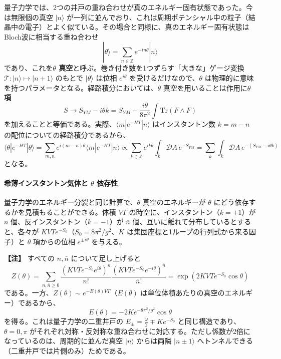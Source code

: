 \documentclass[uplatex, dvipdfmx, book]{jsbook}
\newenvironment{note}{\vspace{1ex}\par\footnotesize\noindent\textbf{【注】}}{\par\vspace{1ex}}
\begin{document}
量子力学では、2つの井戸の重ね合わせが真のエネルギー固有状態であった。今は無限個の真空 $|n\rangle$ が一列に並んでおり、これは周期ポテンシャル中の粒子（結晶中の電子）とよく似ている。その場合と同様に、真のエネルギー固有状態はBloch波に相当する重ね合わせ
\begin{equation}
    |\theta\rangle = \sum_{n \in \mathbb{Z}} e^{-in\theta} |n\rangle
\end{equation}
であり、これを\textbf{$\theta$ 真空}と呼ぶ。巻き付き数を1つずらす「大きな」ゲージ変換 $\mathcal{T}: |n\rangle \mapsto |n+1\rangle$ のもとで $|\theta\rangle$ は位相 $e^{i\theta}$ を受けるだけなので、$\theta$ は物理的に意味を持つパラメータとなる。経路積分においては、$\theta$ 真空を用いることは作用に\textbf{$\theta$ 項}
\begin{equation}
    S \to S_{YM} - i\theta k = S_{YM} - \frac{i\theta}{8\pi^2}\int\mathrm{Tr}(F \wedge F)
\end{equation}
を加えることと等価である。実際、$\langle m|e^{-HT}|n\rangle$ はインスタントン数 $k = m - n$ の配位についての経路積分であるから、
\begin{equation*}
    \langle\theta|e^{-HT}|\theta\rangle = \sum_{m, n} e^{i(m - n)\theta}\langle m|e^{-HT}|n\rangle \propto \sum_{k \in \mathbb{Z}} e^{ik\theta}\int_{k} \mathcal{D}A\, e^{-S_{YM}} = \sum_{k} \int_{k} \mathcal{D}A\, e^{-(S_{YM} - i\theta k)}
\end{equation*}
となる。

\paragraph{希薄インスタントン気体と $\theta$ 依存性}
量子力学のエネルギー分裂と同じ計算で、$\theta$ 真空のエネルギーが $\theta$ にどう依存するかを見積もることができる。体積 $VT$ の時空に、インスタントン（$k = +1$）が $n$ 個、反インスタントン（$k = -1$）が $\bar{n}$ 個、互いに離れて分布しているとすると、各々が $KVTe^{-S_0}$（$S_0 = 8\pi^2/g^2$、$K$ は集団座標と1ループの行列式から来る因子）と $\theta$ 項からの位相 $e^{\pm i\theta}$ を与える。

\begin{note}
すべての $n, \bar{n}$ について足し上げると
\begin{equation*}
    Z(\theta) = \sum_{n, \bar{n} \ge 0} \frac{(KVTe^{-S_0}e^{i\theta})^n}{n!}\frac{(KVTe^{-S_0}e^{-i\theta})^{\bar{n}}}{\bar{n}!} = \exp\left( 2KVTe^{-S_0}\cos\theta \right)
\end{equation*}
である。一方、$Z(\theta) \sim e^{-E(\theta)VT}$（$E(\theta)$ は単位体積あたりの真空のエネルギー）であるから、
\begin{equation*}
    E(\theta) = -2Ke^{-8\pi^2/g^2}\cos\theta
\end{equation*}
を得る。これは量子力学の二重井戸の $E_\pm = \frac{\omega}{2} \mp Ke^{-S_0}$ と同じ構造であり、$\theta = 0, \pi$ がそれぞれ対称・反対称な重ね合わせに対応する。ただし係数が2倍になっているのは、周期的に並んだ真空 $|n\rangle$ からは両隣 $|n \pm 1\rangle$ へトンネルできる（二重井戸では片側のみ）ためである。
\end{note}
\end{document}
